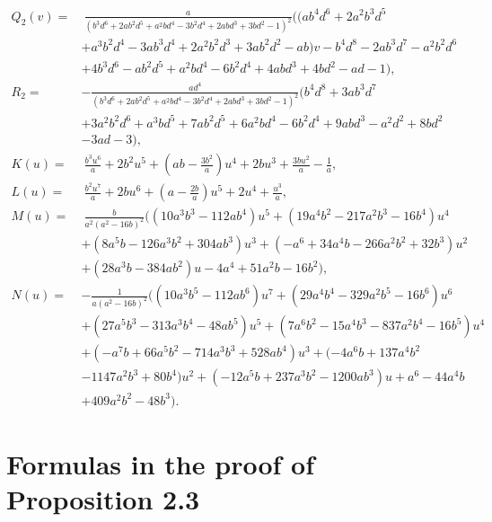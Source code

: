 \documentclass[microtype]{gtpart}     %
\theoremstyle{remark}
\theoremstyle{definition}
\begin{document}
\begin{equation*}
\begin{split}
 Q_2(v) = & ~ \frac{a}{(b^3 d^6 + 2 a b^2 d^5 + a^2 b d^4 - 3 b^2 d^4 + 2 a b d^3 + 3 b d^2 - 1)^2} \big( (a b^4 d^6 + 2 a^2 b^3 d^5 \\
          & + a^3 b^2 d^4 - 3 a b^3 d^4 + 2 a^2 b^2 d^3 + 3 a b^2 d^2 - a b) v - b^4 d^8 - 2 a b^3 d^7 - a^2 b^2 d^6 \\
          & + 4 b^3 d^6 - a b^2 d^5 + a^2 b d^4 - 6 b^2 d^4 + 4 a b d^3 + 4 b d^2 - a d - 1 \big), \\
    R_2 = & - \frac{a d^4}{(b^3 d^6 + 2 a b^2 d^5 + a^2 b d^4 - 3 b^2 d^4 + 2 a b d^3 + 3 b d^2 - 1)^2} (b^4 d^8 + 3 a b^3 d^7 \\
          & + 3 a^2 b^2 d^6 + a^3 b d^5 + 7 a b^2 d^5 + 6 a^2 b d^4 - 6 b^2 d^4 + 9 a b d^3 - a^2 d^2 + 8 b d^2 \\
          & - 3 a d - 3), \\
   K(u) = & ~ \frac{b^3 u^6}{a} + 2 b^2 u^5 + (a b - \frac{3 b^2}{a}) u^4 + 2 b u^3 + \frac{3 b u^2}{a} - \frac{1}{a}, \\
   L(u) = & ~ \frac{b^2 u^7}{a} + 2 b u^6 + (a - \frac{2 b}{a}) u^5 + 2 u^4 + \frac{u^3}{a}, \\
   M(u) = & ~ \frac{b}{a^2 (a^2 - 16 b)^2} \big( (10 a^3 b^3 - 112 a b^4) u^5 + (19 a^4 b^2 - 217 a^2 b^3 - 16 b^4) u^4 \\
          & + (8 a^5 b - 126 a^3 b^2 + 304 a b^3) u^3 + (-a^6 + 34 a^4 b -266 a^2 b^2 +32 b^3) u^2 \\
          & + (28 a^3 b - 384 a b^2) u - 4 a^4 + 51 a^2 b - 16 b^2 \big), \\
   N(u) = & -\frac{1}{a (a^2 - 16 b)^2} \big( (10 a^3 b^5 - 112 a b^6) u^7 + (29 a^4 b^4 - 329 a^2 b^5 - 16 b^6) u^6 \\
          & + (27 a^5 b^3 - 313 a^3 b^4 - 48 a b^5 ) u^5 + (7 a^6 b^2 - 15 a^4 b^3 - 837 a^2 b^4 - 16 b^5) u^4 \\
          & + (-a^7 b + 66 a^5 b^2 - 714 a^3 b^3 + 528 a b^4) u^3 + (-4 a^6 b + 137 a^4 b^2 \\
          & - 1147 a^2 b^3 + 80 b^4) u^2 + (-12 a^5 b + 237 a^3 b^2 - 1200 a b^3) u + a^6 - 44 a^4 b \\
          & + 409 a^2 b^2 - 48 b^3 \big).  
\end{split}
\end{equation*}


\section{Formulas in the proof of Proposition 2.3}
\label{apx:isog}
\end{document}
